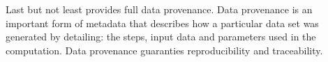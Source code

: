 Last but not least \scipion provides full data provenance. Data provenance is an important form of metadata that describes how a particular data set was generated by detailing: the steps, input data and parameters used in the computation. Data provenance guaranties reproducibility and traceability. %




 

